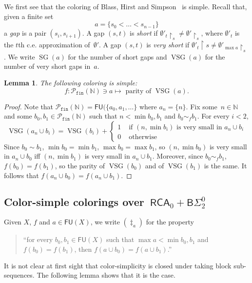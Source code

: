 \documentclass[10pt,a4paper]{article}
\newcommand{\uh}{\upharpoonright}
\newcommand{\BSig}{\mathsf{B}\Sigma^0}
\newcommand{\RCA}[0]{\mathsf{RCA}}
\newcommand{\NN}[0]{\mathbb{N}}
\newcommand{\SG}{\operatorname{SG}} %
\newcommand{\VSG}{\operatorname{VSG}} %
\newcommand{\Pfin}{\mathcal{P}_{\mathtt{fin}}}
\newcommand{\FU}[0]{\mathsf{FU}} %
\def\qt#1{``#1''}%
\numberwithin{theorem}{section}
\newtheorem{lemma}[theorem]{Lemma}
\begin{document}
We first see that the coloring of Blass, Hirst and Simpson~\cite{blassLogicalAnalysisTheorems1987} is simple.
Recall that, given a finite set 
$$a  = \{ s_0 < \dots < s_{n-1} \}$$
a \emph{gap} is a pair $(s_i, s_{i+1})$.
A gap $(s, t)$ is \emph{short} if $\emptyset'_t \uh_s \neq \emptyset' \uh_s$, where $\emptyset'_t$ is the $t$th c.e. approximation of~$\emptyset'$. A gap $(s, t)$ is \emph{very short} if $\emptyset'_t \uh s \neq \emptyset'_{\max a} \uh_s$. We write $\SG(a)$ for the number of short gaps and $\VSG(a)$ for the number of very short gaps in~$a$.

\begin{lemma}
The following coloring is simple:
$$f : \Pfin(\NN) \ni a \mapsto \text{ parity of } \VSG(a).$$
\end{lemma}
\begin{proof}
Note that $\Pfin(\NN) = \FU(\{ a_0, a_1, \dots \}$ where $a_n = \{n\}$.
Fix some~$n \in \NN$ and some $b_0, b_1 \in \Pfin(\NN)$ such that $n < \min b_0, b_1$ and $b_0 \sim_f b_1$.
For every $i < 2$,
$$
\VSG(a_n \cup b_i) = \VSG(b_i) + \begin{cases}
    1 & \text{ if } (n, \min b_i) \mbox{ is very small in } a_n \cup b_i\\
    0 & \text{ otherwise}
\end{cases}
$$
Since $b_0 \sim b_1$, $\min b_0 = \min b_1$, $\max b_0 = \max b_1$, so $(n, \min b_0)$ is very small in $a_n \cup b_0$ iff $(n, \min b_1)$ is very small in $a_n \cup b_1$. Moreover, since $b_0 \sim_f b_1$, $f(b_0) = f(b_1)$, so the parity of $\VSG(b_0)$ and of $\VSG(b_1)$ is the same. It follows that $f(a_n \cup b_0) = f(a_n \cup b_1)$.
\end{proof}


\subsection{Color-simple colorings over~$\RCA_0 + \BSig_2$}

Given $X$, $f$ and $a \in \FU(X)$, we write $(\ddagger_a)$ for the property 
\begin{quote}
\qt{for every $b_0, b_1 \in \FU(X)$ such that $\max a < \min b_0, b_1$ and $f(b_0) = f(b_1)$, then $f(a \cup b_0) = f(a \cup b_1)$.}
\end{quote}

It is not clear at first sight that color-simplicity is closed under taking block sub-sequences.
The following lemma shows that it is the case.
\end{document}
